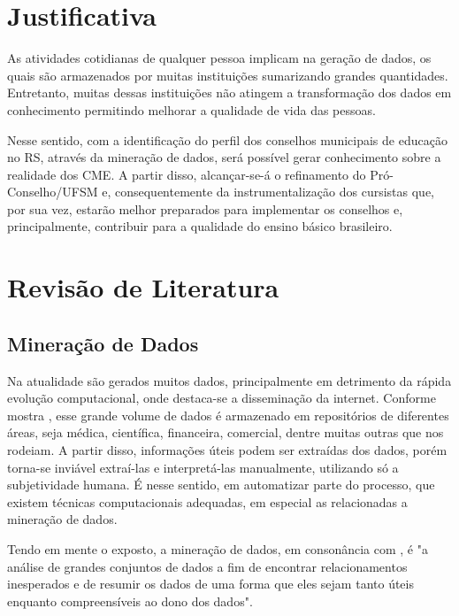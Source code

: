 \documentclass[projtg]{mdtufsm}
\begin{document}
\chapter{Justificativa}
As atividades cotidianas de qualquer pessoa implicam na geração de dados, os quais são armazenados por muitas instituições sumarizando grandes quantidades. Entretanto, muitas dessas instituições não atingem a transformação dos dados em conhecimento permitindo melhorar a qualidade de vida das pessoas. 

Nesse sentido, com a identificação do perfil dos conselhos municipais de educação no RS, através da mineração de dados, será possível gerar conhecimento sobre a realidade dos CME. A partir disso, alcançar-se-á o refinamento do Pró-Conselho/UFSM e, consequentemente da instrumentalização dos cursistas que, por sua vez, estarão melhor preparados para implementar os conselhos e, principalmente, contribuir para a qualidade do ensino básico brasileiro.   


\chapter{Revisão de Literatura}

\section{Mineração de Dados}

Na atualidade são gerados muitos dados, principalmente em detrimento da rápida evolução computacional, onde destaca-se a disseminação da internet. Conforme mostra \cite{enia5}, esse grande volume de dados é armazenado em repositórios de diferentes áreas, seja médica, científica, financeira, comercial, dentre muitas outras que nos rodeiam. A partir disso, informações úteis podem ser extraídas dos dados, porém torna-se inviável extraí-las e interpretá-las manualmente, utilizando só a subjetividade humana. É nesse sentido, em automatizar parte do processo, que existem técnicas computacionais adequadas, em especial as relacionadas a mineração de dados.

Tendo em mente o exposto, a mineração de dados, em consonância com \cite{hand}, é "a análise de grandes conjuntos de dados a fim de encontrar relacionamentos inesperados e de resumir os dados de uma forma que eles sejam tanto úteis enquanto compreensíveis ao dono dos dados".
\end{document}

